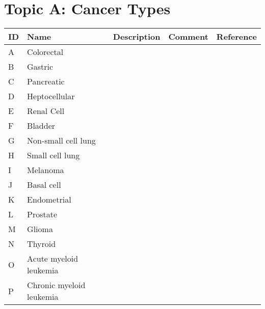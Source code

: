 
\section{Topic A: Cancer Types}

\begin{table}[H]\centering
\begin{tabular}{p{1cm}p{2cm}p{3cm}p{3cm}p{1cm}}
ID & Name & Description & Comment & Reference \\
\hline
A & Colorectal & & & \\
B & Gastric  & & & \\
C & Pancreatic  & & & \\
D & Heptocellular  & & & \\
E & Renal Cell  & & & \\
F & Bladder  & & & \\
G & Non-small cell lung  & & & \\
H & Small cell lung  & & & \\
I & Melanoma  & & & \\
J & Basal cell  & & & \\
K & Endometrial  & & & \\
L & Prostate  & & & \\
M & Glioma  & & & \\
N & Thyroid  & & & \\
O & Acute myeloid leukemia  & & & \\
P & Chronic myeloid leukemia  & & & \\
\hline
\end{tabular}
\end{table}

